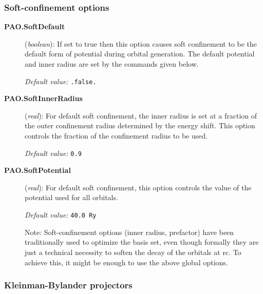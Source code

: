 \subsubsection{Soft-confinement options}
\begin{description}

\item[\textbf{PAO.SoftDefault}] (\textit{boolean}):
If set to true then this option causes soft confinement to be the
default form
of potential during orbital generation. The default potential and
inner radius
are set by the commands given below.

\textit{Default value:} \texttt{.false.}

\item[\textbf{PAO.SoftInnerRadius}] (\textit{real}):
For default soft confinement, the inner radius is set at a fraction of
the outer
confinement radius determined by the energy shift. This option
controls the fraction
of the confinement radius to be used.

\textit{Default value:} \texttt{0.9}

\item[\textbf{PAO.SoftPotential}] (\textit{real}):
For default soft confinement, this option controls the value of the
potential used
for all orbitals.

\textit{Default value:} \texttt{40.0 Ry}


Note: Soft-confinement options (inner radius, prefactor) have been
traditionally used to optimize the basis set, even though formally
they are just a technical necessity to soften the decay of the
orbitals at rc. To achieve this, it might be enough to use the above
global options.

\end{description}

\subsubsection{Kleinman-Bylander projectors}


